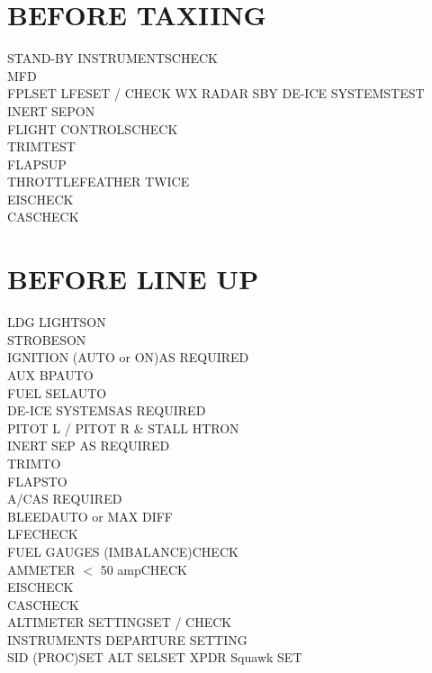 \documentclass{article}
\begin{document}
\begin{multicols*}{2}
\section*{BEFORE TAXIING}
STAND-BY INSTRUMENTS\dotfill CHECK\\
MFD\\
\hspace*{6mm} FPL\dotfill SET
\hspace*{6mm} LFE\dotfill SET / CHECK
\hspace*{6mm} WX RADAR \dotfill SBY
DE-ICE SYSTEMS\dotfill TEST\\
INERT SEP\dotfill ON\\
FLIGHT CONTROLS\dotfill CHECK\\
TRIM\dotfill TEST\\
FLAPS\dotfill UP\\
THROTTLE\dotfill FEATHER TWICE\\
EIS\dotfill CHECK\\
CAS\dotfill CHECK
\section*{BEFORE LINE UP}
LDG LIGHTS\dotfill ON\\
STROBES\dotfill ON\\
IGNITION (AUTO or ON)\dotfill AS REQUIRED\\
AUX BP\dotfill  AUTO\\
FUEL SEL\dotfill AUTO\\
DE-ICE SYSTEMS\dotfill AS REQUIRED\\
PITOT L / PITOT R \& STALL HTR\dotfill ON\\
INERT SEP \dotfill AS REQUIRED\\
TRIM\dotfill TO\\
FLAPS\dotfill TO\\
A/C\dotfill AS REQUIRED\\
BLEED\dotfill AUTO or MAX DIFF\\
LFE\dotfill CHECK\\
FUEL GAUGES (IMBALANCE)\dotfill CHECK\\
AMMETER $<$ \color{Red}50 amp\color{Black}\dotfill CHECK\\
EIS\dotfill CHECK\\
CAS\dotfill CHECK\\
ALTIMETER SETTING\dotfill SET / CHECK\\
INSTRUMENTS DEPARTURE SETTING\\
\hspace*{6mm} SID (PROC)\dotfill SET
\hspace*{6mm} ALT SEL\dotfill SET
\hspace*{6mm} XPDR Squawk \dotfill SET

\end{multicols*}
\end{document}
